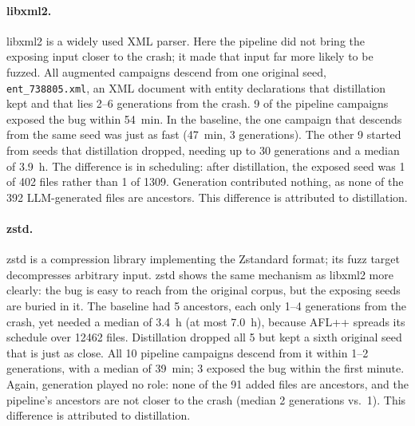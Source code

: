 \paragraph{libxml2.}
libxml2 is a widely used XML parser.
Here the pipeline did not bring the exposing input closer to the crash; it made that input far more likely to be fuzzed.
All augmented campaigns descend from one original seed, \texttt{ent\_738805.xml}, an XML document with entity declarations that distillation kept and that lies \numrange{2}{6} generations from the crash.
\num{9} of the pipeline campaigns exposed the bug within \SI{54}{\minute}.
In the baseline, the one campaign that descends from the same seed was just as fast (\SI{47}{\minute}, \num{3} generations).
The other \num{9} started from seeds that distillation dropped, needing up to \num{30} generations and a median of \SI{3.9}{\hour}.
The difference is in scheduling: after distillation, the exposed seed was \num{1} of \num{402} files rather than \num{1} of \num{1309}.
Generation contributed nothing, as none of the \num{392} \ac{LLM}-generated files are ancestors.
This difference is attributed to distillation.

\paragraph{zstd.}
zstd is a compression library implementing the Zstandard format; its fuzz target decompresses arbitrary input.
zstd shows the same mechanism as libxml2 more clearly: the bug is easy to reach from the original corpus, but the exposing seeds are buried in it.
The baseline had \num{5} ancestors, each only \numrange{1}{4} generations from the crash, yet needed a median of \SI{3.4}{\hour} (at most \SI{7.0}{\hour}), because AFL++ spreads its schedule over \num{12462} files.
Distillation dropped all \num{5} but kept a sixth original seed that is just as close.
All \num{10} pipeline campaigns descend from it within \numrange{1}{2} generations, with a median of \SI{39}{\minute}; \num{3} exposed the bug within the first minute.
Again, generation played no role: none of the \num{91} added files are ancestors, and the pipeline's ancestors are not closer to the crash (median \num{2} generations vs.\ \num{1}).
This difference is attributed to distillation.


